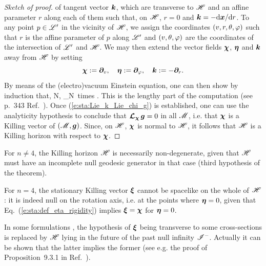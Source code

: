 \begin{proof}[Sketch of proof]
of tangent vector $\bm{k}$, which are transverse to $\mathscr{H}$ and an affine parameter
$r$ along each of them such that, on $\mathscr{H}$, $r=0$ and $\bm{k} = - \mathrm{d}{\bm{x}}/\mathrm{d} r$.
To any point $p\in \mathscr{L}'$ in the vicinity of $\mathscr{H}$, we assign the coordinates $(v,r,\theta,\varphi)$
such that $r$ is the affine parameter of $p$ along $\mathscr{L}'$ and $(v,\theta,\varphi)$
are the coordinates of the intersection of $\mathscr{L}'$ and $\mathscr{H}$. We may then extend
the vector fields $\bm{\chi}$, $\bm{\eta}$ and $\bm{k}$ away from $\mathscr{H}$ by setting
\[
    \bm{\chi} := \bm{\partial}_v,\quad
    \bm{\eta} := \bm{\partial}_\varphi,\quad
    \bm{k} := - \bm{\partial}_r .
\]
By means of the (electro)vacuum Einstein equation, one can then show by induction that,
\be \label{e:sta:Lie_k_Lie_chi_g}
    \forall N\in{}, \quad {}_{N\mbox{\ times}}
    \Lie{\chi}   .
\ee
This is the lengthy part of the computation (see p.~343 Ref.~\cite{HawkiE73}).
Once (\ref{e:sta:Lie_k_Lie_chi_g})
is established, one can use the analyticity hypothesis to conclude that $\bm{\mathcal{L}}_{\bm{\chi}}\, \bm{g} = 0$
in all $\mathscr{M}$, i.e. that $\bm{\chi}$ is a Killing vector of $(\mathscr{M},\bm{g})$. Since, on $\mathscr{H}$,
$\bm{\chi}$ is normal to $\mathscr{H}$, it follows that $\mathscr{H}$ is a Killing horizon
with respect to $\bm{\chi}$.
\end{proof}

\begin{remark}
For $n\neq 4$, the Killing horizon $\mathscr{H}$ is necessarily non-degenerate, given
that $\mathscr{H}$ must have an incomplete null geodesic generator in that case
(third hypothesis of the theorem).
\end{remark}

\begin{remark}
For $n=4$, the stationary Killing vector $\bm{\xi}$ cannot be spacelike
on the whole of $\mathscr{H}$: it is indeed null on the rotation axis, i.e.
at the points where $\bm{\eta} = 0$, given that Eq.~(\ref{e:sta:def_eta_rigidity})
implies $\bm{\xi} = \bm{\chi}$ for $\bm{\eta}=0$.
\end{remark}

\begin{remark}
In some formulations \cite{HollaIW07,HawkiE73}, the hypothesis of $\bm{\xi}$
being transverse to some cross-sections is replaced by $\mathscr{H}$ lying in
the future of the past null infinity $\mathscr{I}^-$. Actually it can be shown
that the latter implies the former (see e.g. the proof of Proposition~9.3.1
in Ref.~\cite{HawkiE73}).
\end{remark}

